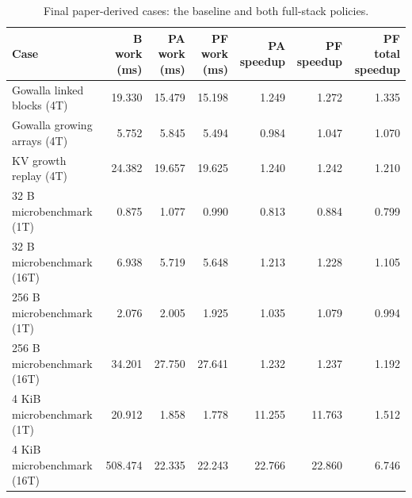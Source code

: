 \begin{table}[t]
\caption{Final paper-derived cases: the baseline and both full-stack policies.}\label{tab:paper-final}
\centering\small
\begin{tabular}{lrrrrrr}\toprule
Case & B work (ms) & PA work (ms) & PF work (ms) & PA speedup & PF speedup & PF total speedup \\ \midrule
Gowalla linked blocks (4T) & 19.330 & 15.479 & 15.198 & 1.249 & 1.272 & 1.335 \\
Gowalla growing arrays (4T) & 5.752 & 5.845 & 5.494 & 0.984 & 1.047 & 1.070 \\
KV growth replay (4T) & 24.382 & 19.657 & 19.625 & 1.240 & 1.242 & 1.210 \\
32 B microbenchmark (1T) & 0.875 & 1.077 & 0.990 & 0.813 & 0.884 & 0.799 \\
32 B microbenchmark (16T) & 6.938 & 5.719 & 5.648 & 1.213 & 1.228 & 1.105 \\
256 B microbenchmark (1T) & 2.076 & 2.005 & 1.925 & 1.035 & 1.079 & 0.994 \\
256 B microbenchmark (16T) & 34.201 & 27.750 & 27.641 & 1.232 & 1.237 & 1.192 \\
4 KiB microbenchmark (1T) & 20.912 & 1.858 & 1.778 & 11.255 & 11.763 & 1.512 \\
4 KiB microbenchmark (16T) & 508.474 & 22.335 & 22.243 & 22.766 & 22.860 & 6.746 \\
\bottomrule\end{tabular}
\par\vspace{2pt}{\footnotesize Graph cases are reduced ports; KV is an allocation-only replay and excludes attention/serving. Original request sizes and 128 microbenchmark requests/tasklet are retained. Values below one are regressions.}
\end{table}
